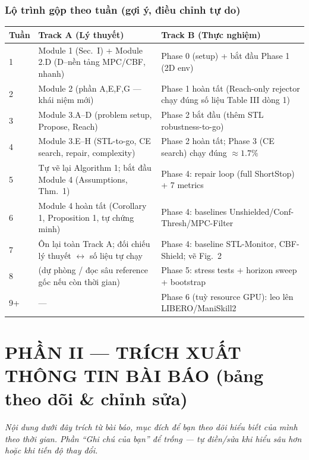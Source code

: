 \documentclass[a4paper,12pt]{article}
\let\stdsection\section
\renewcommand{\section}{\clearpage\stdsection}
\begin{document}
\section{Lộ trình gộp theo tuần (gợi ý, điều chỉnh tự do)}
\begin{longtable}{@{}p{1.6cm} p{7.6cm} p{7.4cm}@{}}
\toprule
Tuần & Track A (Lý thuyết) & Track B (Thực nghiệm) \\
\midrule
\endhead
1 & Module 1 (Sec.~I) + Module 2.D (D--nền tảng MPC/CBF, nhanh) & Phase 0 (setup) + bắt đầu Phase 1 (2D env) \\
2 & Module 2 (phần A,E,F,G — khái niệm mới) & Phase 1 hoàn tất (Reach-only rejector chạy đúng số liệu Table III dòng 1) \\
3 & Module 3.A--D (problem setup, Propose, Reach) & Phase 2 bắt đầu (thêm STL robustness-to-go) \\
4 & Module 3.E--H (STL-to-go, CE search, repair, complexity) & Phase 2 hoàn tất; Phase 3 (CE search) chạy đúng $\approx1.7\%$ \\
5 & Tự vẽ lại Algorithm 1; bắt đầu Module 4 (Assumptions, Thm.~1) & Phase 4: repair loop (full ShortStop) + 7 metrics \\
6 & Module 4 hoàn tất (Corollary 1, Proposition 1, tự chứng minh) & Phase 4: baselines Unshielded/Conf-Thresh/MPC-Filter \\
7 & Ôn lại toàn Track A; đối chiếu lý thuyết $\leftrightarrow$ số liệu tự chạy & Phase 4: baseline STL-Monitor, CBF-Shield; vẽ Fig.~2 \\
8 & (dự phòng / đọc sâu reference gốc nếu còn thời gian) & Phase 5: stress tests + horizon sweep + bootstrap \\
9+ & --- & Phase 6 (tuỳ resource GPU): leo lên LIBERO/ManiSkill2 \\
\bottomrule
\end{longtable}

\part*{PHẦN II --- TRÍCH XUẤT THÔNG TIN BÀI BÁO (bảng theo dõi \& chỉnh sửa)}\label{sec:extraction}
\textit{Nội dung dưới đây trích từ bài báo, mục đích để bạn theo dõi hiểu biết của mình theo thời gian. Phần ``Ghi chú của bạn'' để trống — tự điền/sửa khi hiểu sâu hơn hoặc khi tiến độ thay đổi.}
\end{document}
